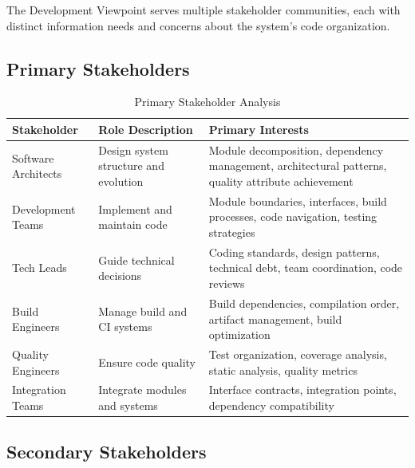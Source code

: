 \documentclass[11pt,letterpaper]{article}
\begin{document}
The Development Viewpoint serves multiple stakeholder communities, each with distinct information needs and concerns about the system's code organization.

\subsection{Primary Stakeholders}

\begin{table}[H]
\centering
\caption{Primary Stakeholder Analysis}
\small
\begin{tabular}{@{}L{2.8cm}L{3.8cm}L{6.8cm}@{}}
\toprule
\textbf{Stakeholder} & \textbf{Role Description} & \textbf{Primary Interests} \\
\midrule
Software Architects & Design system structure and evolution & Module decomposition, dependency management, architectural patterns, quality attribute achievement \\
\addlinespace
Development Teams & Implement and maintain code & Module boundaries, interfaces, build processes, code navigation, testing strategies \\
\addlinespace
Tech Leads & Guide technical decisions & Coding standards, design patterns, technical debt, team coordination, code reviews \\
\addlinespace
Build Engineers & Manage build and CI systems & Build dependencies, compilation order, artifact management, build optimization \\
\addlinespace
Quality Engineers & Ensure code quality & Test organization, coverage analysis, static analysis, quality metrics \\
\addlinespace
Integration Teams & Integrate modules and systems & Interface contracts, integration points, dependency compatibility \\
\bottomrule
\end{tabular}
\end{table}

\subsection{Secondary Stakeholders}
\end{document}
